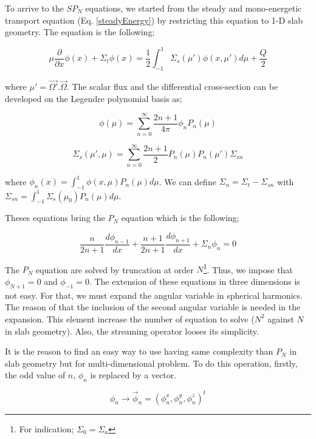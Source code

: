 \documentclass[a4paper, 12pt]{report}
\begin{document}
To arrive to the $SP_N$ equations, we started from the steady and mono-energetic transport equation (Eq. \ref{steadyEnergy}) by restricting this equation to 1-D slab geometry. The equation is the following;

\begin{equation}
\mu \frac{\partial}{\partial x}\phi(x) + \Sigma_t \phi(x) = \frac{1}{2} \int_{-1}^{1} \Sigma_s(\mu')\phi(x,\mu') d\mu + \frac{Q}{2}  
\end{equation}

where $\mu' = \vec{\Omega'}.\vec{\Omega}$. The scalar flux and the differential cross-section can be developed on the Legendre polynomial basis as;

\begin{equation}
\phi(\mu) = \sum_{n=0}^{\infty} \frac{2n+1}{4\pi} \phi_n P_n(\mu)
\end{equation}

\begin{equation}
\Sigma_s(\mu',\mu) = \sum_{n=0}^{\infty} \frac{2n+1}{2} P_n(\mu)P_n(\mu')\Sigma_{sn}
\end{equation}

where $\phi_n(x) = \int_{-1}^{1} \phi(x,\mu) P_n(\mu) d\mu$. We can define $\Sigma_n = \Sigma_t - \Sigma_{sn}$ with $\Sigma_{sn} = \int_{-1}^{1} \Sigma_s(\mu_0) P_n(\mu) d\mu$.

Theses equations bring the $P_N$ equation which is the following;

\begin{equation}
\frac{n}{2n+1} \frac{d\phi_{n-1}}{dx} + \frac{n+1}{2n+1} \frac{d \phi_{n+1}}{dx} + \Sigma_n\phi_n = 0
\end{equation}

The $P_N$ equation are solved by truncation at order $N$\footnote{For indication; $\Sigma_0 = \Sigma_a$}. Thus, we impose that $\phi_{N+1}=0$ and $\phi_{-1} = 0$. The extension of these equations in three dimensions is not easy. For that, we must expand the angular variable in spherical harmonics. The reason of that the inclusion of the second angular variable is needed in the expansion. This element increase the number of equation to solve ($N^2$ against $N$ in slab geometry). Also, the streaming operator looses its simplicity.

It is the reason to find an easy way to use having same complexity than $P_N$ in slab geometry but for multi-dimensional problem. To do this operation, firstly, the odd value of $n$, $\phi_n$ is replaced by a vector.

\begin{equation}
\phi_n \rightarrow \vec{\phi}_n = (\phi_n^x,\phi_n^y,\phi_n^z)^t
\end{equation}
\end{document}
